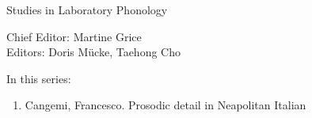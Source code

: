 
{\raggedleft{}}

\bigskip

{\large Studies in Laboratory Phonology}

\bigskip

Chief Editor:  Martine Grice%
\\
Editors:    Doris Mücke, %
    Taehong Cho %

\bigskip

In this series:

\begin{enumerate}
\item Cangemi, Francesco. Prosodic detail in Neapolitan Italian
\end{enumerate}





